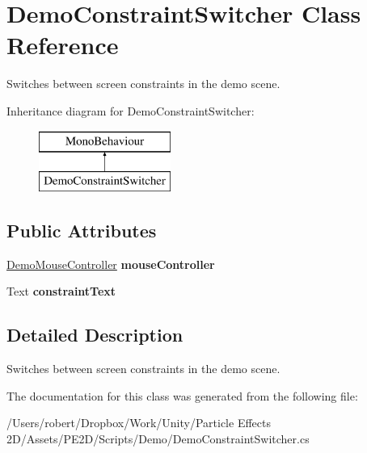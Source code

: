 \hypertarget{class_demo_constraint_switcher}{}\section{Demo\+Constraint\+Switcher Class Reference}
\label{class_demo_constraint_switcher}


Switches between screen constraints in the demo scene.  


Inheritance diagram for Demo\+Constraint\+Switcher\+:\begin{figure}[H]
\begin{center}
\leavevmode
\includegraphics[height=2.000000cm]{class_demo_constraint_switcher}
\end{center}
\end{figure}
\subsection*{Public Attributes}
\begin{DoxyCompactItemize}
\item 
\hypertarget{class_demo_constraint_switcher_af43145389170ecb768eddb9385820529}{}\hyperlink{class_demo_mouse_controller}{Demo\+Mouse\+Controller} {\bfseries mouse\+Controller}\label{class_demo_constraint_switcher_af43145389170ecb768eddb9385820529}

\item 
\hypertarget{class_demo_constraint_switcher_ac5b5887291ba6e09aaac65000c48b067}{}Text {\bfseries constraint\+Text}\label{class_demo_constraint_switcher_ac5b5887291ba6e09aaac65000c48b067}

\end{DoxyCompactItemize}


\subsection{Detailed Description}
Switches between screen constraints in the demo scene. 



The documentation for this class was generated from the following file\+:\begin{DoxyCompactItemize}
\item 
/\+Users/robert/\+Dropbox/\+Work/\+Unity/\+Particle Effects 2\+D/\+Assets/\+P\+E2\+D/\+Scripts/\+Demo/Demo\+Constraint\+Switcher.\+cs\end{DoxyCompactItemize}
